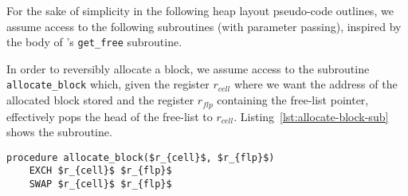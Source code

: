 


For the sake of simplicity in the following heap layout pseudo-code outlines, we assume access to the following subroutines (with parameter passing), inspired by the body of \citeauthor{ha:heap}'s \texttt{get\_free} subroutine.

In order to reversibly allocate a block, we assume access to the subroutine \texttt{allocate\_block} which, given the register $r_{cell}$ where we want the address of the allocated block stored and the register $r_{flp}$ containing the free-list pointer, effectively pops the head of the free-list to  $r_{cell}$. Listing~\ref{lst:allocate-block-sub} shows the subroutine.

\begin{lstlisting}[caption={\texttt{allocate\_block} subroutine}, language=janus, style=basic,label={lst:allocate-block-sub}]
procedure allocate_block($r_{cell}$, $r_{flp}$)
	EXCH $r_{cell}$ $r_{flp}$
	SWAP $r_{cell}$ $r_{flp}$
\end{lstlisting}






